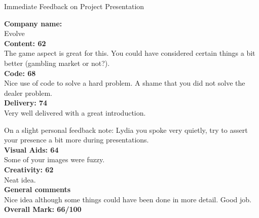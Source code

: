 \documentclass{article}
\begin{document}
\begin{center}
\Huge{Immediate Feedback on Project Presentation}\\
\end{center}


\normalsize
\textbf{Company name:}\\

Evolve \\

\textbf{Content: 62}\\

The game aspect is great for this.
You could have considered certain things a bit better (gambling market or not?).\\

\textbf{Code: 68}\\

Nice use of code to solve a hard problem.
A shame that you did not solve the dealer problem.\\

\textbf{Delivery: 74}\\

Very well delivered with a great introduction.

On a slight personal feedback note: Lydia you spoke very quietly, try to assert your presence a bit more during presentations.\\

\textbf{Visual Aids: 64}\\

Some of your images were fuzzy.\\

\textbf{Creativity: 62}\\

Neat idea.\\

\textbf{General comments}\\

Nice idea although some things could have been done in more detail.
Good job.\\

\textbf{Overall Mark: 66/100}
\end{document}
